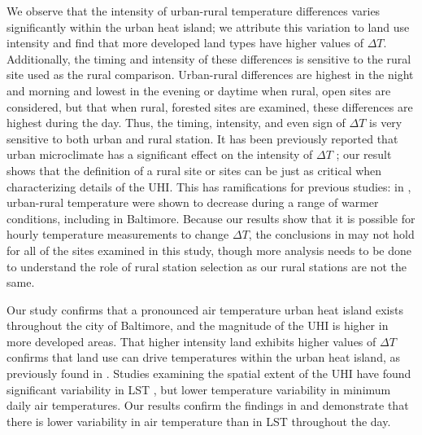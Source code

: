 \documentclass[draft,linenumbers]{agujournal}
\begin{document}
We observe that the intensity of urban-rural temperature differences varies significantly within the urban heat island; we attribute this variation to land use intensity and find that more developed land types have higher values of $\Delta T$.  
Additionally, the timing and intensity of these differences is sensitive to the rural site used as the rural comparison.
Urban-rural differences are highest in the night and morning and lowest in the evening or daytime when rural, open sites are considered, but that when rural, forested sites are examined, these differences are highest during the day. 
Thus, the timing, intensity, and even sign of $\Delta T$ is very sensitive to both urban and rural station. 
It has been previously reported that urban microclimate has a significant effect on the intensity of $\Delta T$ \citep{lcz};  our result shows that the definition of a rural site or sites can be just as critical when characterizing details of the UHI.
This has ramifications for previous studies: in \cite{scott2018reduced}, urban-rural temperature were shown to decrease during a range of warmer conditions, including in Baltimore. 
 Because our results show that it is possible for hourly temperature measurements to change  
$\Delta T$, the conclusions in \cite{scott2018reduced} may not hold for all of the sites examined in this study, though more analysis needs to be done to understand the role of rural station selection as our rural stations are not the same.

Our study confirms that a pronounced air temperature urban heat island exists throughout the city of Baltimore, and the magnitude of the UHI is higher in more developed areas.
That higher intensity land exhibits higher values of $\Delta T$ confirms that land use can drive temperatures within the urban heat island, as previously found in \cite{Huang20111753,Boug10}. 
 Studies examining the spatial extent of the UHI have found significant variability in LST \citep{Huang20111753}, but lower temperature variability in minimum daily air temperatures. 
Our results confirm the findings in \cite{scott2017intraurban} and demonstrate that there is lower variability in air temperature than in LST throughout the day. 
\end{document}
